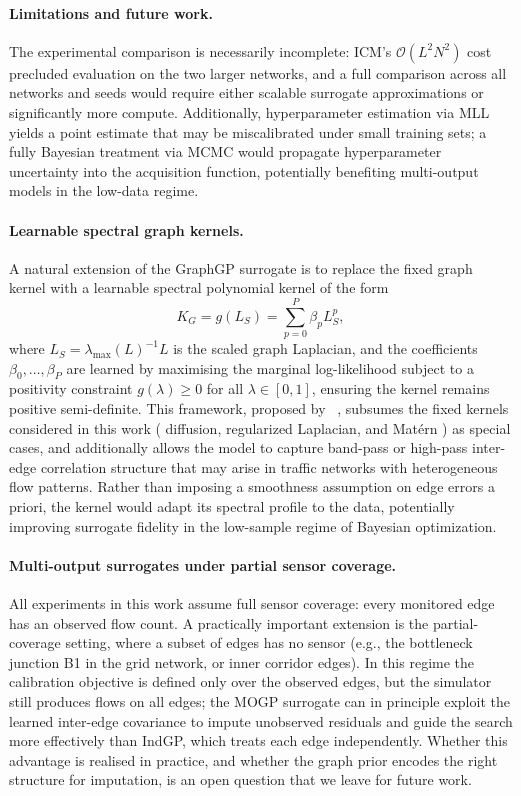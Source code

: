 \documentclass[11pt]{article}
\begin{document}
\paragraph{Limitations and future work.}
The experimental comparison is necessarily incomplete: ICM's $\mathcal{O}(L^2 N^2)$ cost precluded evaluation on the two larger networks, and a full comparison across all networks and seeds would require either scalable surrogate approximations or significantly more compute. Additionally, hyperparameter estimation via MLL yields a point estimate that may be miscalibrated under small training sets; a fully Bayesian treatment via MCMC would propagate hyperparameter uncertainty into the acquisition function, potentially benefiting multi-output models in the low-data regime.

\paragraph{Learnable spectral graph kernels.}
A natural extension of the GraphGP surrogate is to replace the fixed graph kernel
with a learnable spectral polynomial kernel of the form
\begin{equation}
    K_G = g(L_S) = \sum_{p=0}^{P} \beta_p L_S^p,
\end{equation}
where $L_S = \lambda_{\max}(L)^{-1} L$ is the scaled graph Laplacian, and the
coefficients $\beta_0, \ldots, \beta_P$ are learned by maximising the marginal
log-likelihood subject to a positivity constraint $g(\lambda) \geq 0$ for all
$\lambda \in [0,1]$, ensuring the kernel remains positive semi-definite.
This framework, proposed by ~\parencite{zhi2023}, subsumes the fixed kernels
considered in this work ( diffusion, regularized Laplacian, and Matérn ) as
special cases, and additionally allows the model to capture band-pass or
high-pass inter-edge correlation structure that may arise in traffic networks
with heterogeneous flow patterns. Rather than imposing a smoothness assumption
on edge errors a priori, the kernel would adapt its spectral profile to the
data, potentially improving surrogate fidelity in the low-sample regime of
Bayesian optimization.

\paragraph{Multi-output surrogates under partial sensor coverage.}
All experiments in this work assume full sensor coverage: every monitored edge has an observed flow count. A practically important extension is the partial-coverage setting, where a subset of edges has no sensor (e.g., the bottleneck junction B1 in the grid network, or inner corridor edges). In this regime the calibration objective is defined only over the observed edges, but the simulator still produces flows on all edges; the MOGP surrogate can in principle exploit the learned inter-edge covariance to impute unobserved residuals and guide the search more effectively than IndGP, which treats each edge independently. Whether this advantage is realised in practice, and whether the graph prior encodes the right structure for imputation, is an open question that we leave for future work.
\end{document}
